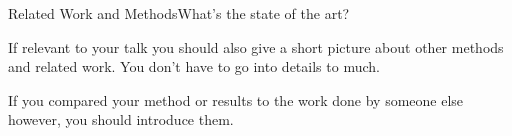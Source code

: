 \begin{frame}[t]{Related Work and Methods}{What's the state of the art?}

  If relevant to your talk you should also give a short picture about
  other methods and related work. You don't have to go into details to much.

  If you compared your method or results to the work done by someone
  else however, you should introduce them.

\end{frame}
